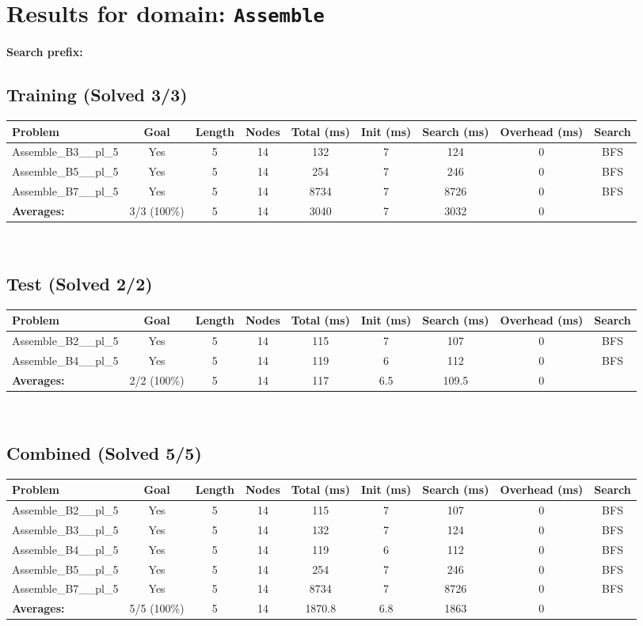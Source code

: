 \documentclass{article}
\begin{document}
\section*{Results for domain: \texttt{Assemble}}
\textbf{Search prefix:} 
\\[0.5cm]
\subsection*{Training (Solved 3/3)}
\begin{tabular}{lcccccccc}
\toprule
Problem & Goal & Length & Nodes & Total (ms) & Init (ms) & Search (ms) & Overhead (ms) & Search \\
\midrule
Assemble\_B3\_\_pl\_5 & Yes & 5 & 14 & 132 & 7 & 124 & 0 & BFS \\
Assemble\_B5\_\_pl\_5 & Yes & 5 & 14 & 254 & 7 & 246 & 0 & BFS \\
Assemble\_B7\_\_pl\_5 & Yes & 5 & 14 & 8734 & 7 & 8726 & 0 & BFS \\
\textbf{Averages:} & 3/3 (100\%) & 5 & 14 & 3040 & 7 & 3032 & 0 & \\
\bottomrule
\end{tabular}
\\[0.7cm]
\subsection*{Test (Solved 2/2)}
\begin{tabular}{lcccccccc}
\toprule
Problem & Goal & Length & Nodes & Total (ms) & Init (ms) & Search (ms) & Overhead (ms) & Search \\
\midrule
Assemble\_B2\_\_pl\_5 & Yes & 5 & 14 & 115 & 7 & 107 & 0 & BFS \\
Assemble\_B4\_\_pl\_5 & Yes & 5 & 14 & 119 & 6 & 112 & 0 & BFS \\
\textbf{Averages:} & 2/2 (100\%) & 5 & 14 & 117 & 6.5 & 109.5 & 0 & \\
\bottomrule
\end{tabular}
\\[0.7cm]
\subsection*{Combined (Solved 5/5)}
\begin{tabular}{lcccccccc}
\toprule
Problem & Goal & Length & Nodes & Total (ms) & Init (ms) & Search (ms) & Overhead (ms) & Search \\
\midrule
Assemble\_B2\_\_pl\_5 & Yes & 5 & 14 & 115 & 7 & 107 & 0 & BFS \\
Assemble\_B3\_\_pl\_5 & Yes & 5 & 14 & 132 & 7 & 124 & 0 & BFS \\
Assemble\_B4\_\_pl\_5 & Yes & 5 & 14 & 119 & 6 & 112 & 0 & BFS \\
Assemble\_B5\_\_pl\_5 & Yes & 5 & 14 & 254 & 7 & 246 & 0 & BFS \\
Assemble\_B7\_\_pl\_5 & Yes & 5 & 14 & 8734 & 7 & 8726 & 0 & BFS \\
\textbf{Averages:} & 5/5 (100\%) & 5 & 14 & 1870.8 & 6.8 & 1863 & 0 & \\
\bottomrule
\end{tabular}
\\[0.7cm]
\end{document}
